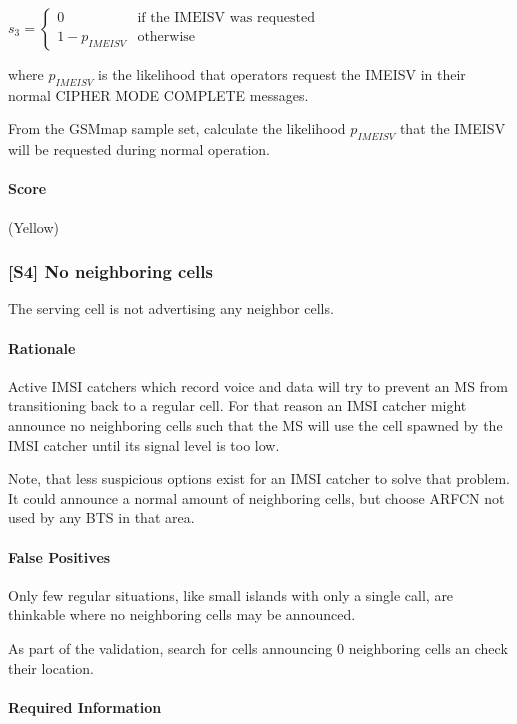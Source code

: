 \documentclass[a4paper,11pt,notitlepage,bigheadings,oneside]{scrartcl}
\begin{document}
$s_3 =
\begin{cases}
	0 		& \text{if the IMEISV was requested} \\
	1 - p_{IMEISV}	& \text{otherwise}
\end{cases}$

where $p_{IMEISV}$ is the likelihood that operators request the IMEISV in their
normal CIPHER MODE COMPLETE messages.

\TBD{} From the GSMmap sample set, calculate the likelihood $p_{IMEISV}$ that
the IMEISV will be requested during normal operation.

\paragraph{Score}

\TBD{} (Yellow)

\subsubsection{[S4] No neighboring cells}

The serving cell is not advertising any neighbor cells.

\paragraph{Rationale}

Active IMSI catchers which record voice and data will try to prevent an MS from
transitioning back to a regular cell. For that reason an IMSI catcher might
announce no neighboring cells such that the MS will use the cell spawned by the
IMSI catcher until its signal level is too low.

Note, that less suspicious options exist for an IMSI catcher to solve that
problem. It could announce a normal amount of neighboring cells, but choose
ARFCN not used by any BTS in that area.

\paragraph{False Positives}

Only few regular situations, like small islands with only a single call, are
thinkable where no neighboring cells may be announced.

\TBD{} As part of the validation, search for cells announcing 0 neighboring
cells an check their location.

\paragraph{Required Information}
\end{document}
